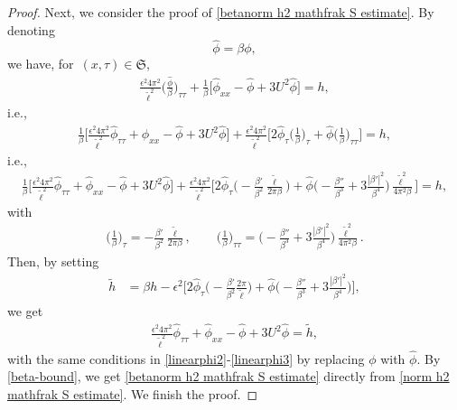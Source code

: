 \documentclass[10pt,a4paper]{amsart}
\begin{document}
\begin{proof}
 Next, we consider the proof of \eqref{betanorm h2 mathfrak S estimate}.
By denoting \[ \hat\phi = \beta \phi, \] we have,
for $\,(x, \tau)\in \mathfrak S$,
\begin{align*}
 \frac{\epsilon^2 4\pi^2}{{\tilde\ell}^2} \Big(\frac{\hat\phi} {\beta} \Big)_{\tau\tau} + \frac1\beta\Big[\hat\phi_{xx} - \hat\phi+3U^2 \hat\phi \Big]= h,
\end{align*}
i.e.,
\begin{align*}
\frac1\beta\Big[ \frac{\epsilon^2 4\pi^2}{{\tilde\ell}^2} \hat\phi_{\tau\tau} + \hat\phi_{xx} - \hat\phi+3U^2 \hat\phi \Big] + \frac{\epsilon^2 4\pi^2}{{\tilde\ell}^2}\Big[2\hat\phi_\tau \Big(\frac1\beta \Big)_\tau + \hat\phi \Big(\frac1\beta \Big)_{\tau\tau} \Big] = h,
\end{align*}
i.e.,
\begin{align*}
\frac1\beta\Big[ \frac{\epsilon^2 4\pi^2}{{\tilde\ell}^2} \hat\phi_{\tau\tau} + \hat\phi_{xx} - \hat\phi+3U^2 \hat\phi \Big] + \frac{\epsilon^2 4\pi^2}{{\tilde\ell}^2}\Big[2\hat\phi_\tau \Big(-\frac{\beta'}{\beta^2} \frac{\tilde \ell} {2\pi \beta}\Big) + \hat\phi \Big(-\frac{\beta''} {\beta^3} +3\frac{|\beta'|^2} {\beta^4} \Big)\frac{\tilde \ell^2} {4\pi^2\beta} \Big] = h,
\end{align*}
with
\begin{align*}
\Big(\frac1\beta \Big)_\tau = -\frac{\beta'}{\beta^2} \frac{\tilde \ell} {2\pi \beta},
\qquad
\Big(\frac1\beta \Big)_{\tau\tau} = \Big(-\frac{\beta''} {\beta^3} +3\frac{|\beta'|^2} {\beta^4} \Big)\frac{\tilde \ell^2} {4\pi^2\beta}.
\end{align*}
Then, by setting
\begin{align*}
 \tilde h
& =\beta h - \epsilon^2\Big[2\hat\phi_\tau \Big(-\frac{\beta'}{\beta^2} \frac{2\pi}{\tilde \ell} \Big) + \hat\phi \Big(-\frac{\beta''} {\beta^3} +3\frac{|\beta'|^2} {\beta^4} \Big) \Big],
\end{align*}
 we get
\begin{align*}
\frac{\epsilon^2 4\pi^2}{{\tilde\ell}^2} \hat\phi_{\tau\tau} + \hat\phi_{xx} - \hat\phi+3U^2 \hat\phi = \tilde h,
\end{align*}
with the same conditions in \eqref{linearphi2}-\eqref{linearphi3} by replacing $\phi$ with $\hat\phi$.
By \eqref{beta-bound}, we get \eqref{betanorm h2 mathfrak S estimate} directly from \eqref{norm h2 mathfrak S estimate}.
We finish the proof.
\end{proof}
\end{document}

